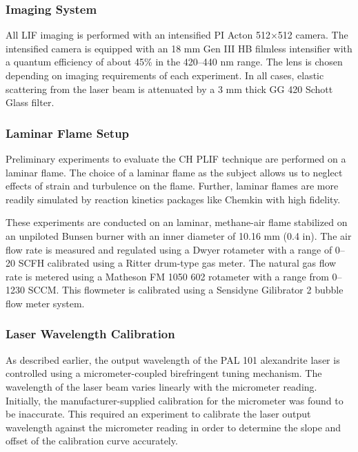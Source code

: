 \subsubsection{Imaging System}
\label{subsubsec:plif-imaging-system}

All LIF imaging is performed with an intensified PI Acton 512\(\times\)512 camera.
The intensified camera is equipped with an 18 mm Gen III HB filmless intensifier with a quantum efficiency of about 45\% in the 420--440 nm range.
The lens is chosen depending on imaging requirements of each experiment.
In all cases, elastic scattering from the laser beam is attenuated by a 3 mm thick GG 420 Schott Glass filter.

\subsubsection{Laminar Flame Setup}
\label{subsubsec:plif-laminar-flame-setup}

Preliminary experiments to evaluate the CH PLIF technique are performed on a laminar flame.
The choice of a laminar flame as the subject allows us to neglect effects of strain and turbulence on the flame.
Further, laminar flames are more readily simulated by reaction kinetics packages like Chemkin with high fidelity.

These experiments are conducted on an laminar, methane-air flame stabilized on an unpiloted Bunsen burner with an inner diameter of 10.16 mm (0.4 in).
The air flow rate is measured and regulated using a Dwyer rotameter with a range of 0--20 SCFH calibrated using a Ritter drum-type gas meter.
The natural gas flow rate is metered using a Matheson FM 1050 602 rotameter with a range from 0--1230 SCCM.
This flowmeter is calibrated using a Sensidyne Gilibrator 2 bubble flow meter system.

\subsubsection{Laser Wavelength Calibration}
\label{subsubsec:plif-laser-wavelength-calibration}



As described earlier, the output wavelength of the PAL 101 alexandrite laser is controlled using a micrometer-coupled birefringent tuning mechanism.
The wavelength of the laser beam varies linearly with the micrometer reading.
Initially, the manufacturer-supplied calibration for the micrometer was found to be inaccurate.
This required an experiment to calibrate the laser output wavelength against the micrometer reading in order to determine the slope and offset of the calibration curve accurately.

